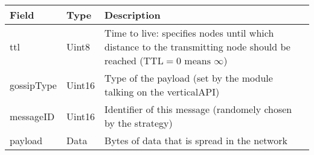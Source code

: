 \begin{tabularx}{.85\linewidth}{llX}
	\toprule
	Field & Type & Description
	\\
	\midrule
	ttl & Uint8 & Time to live: specifies nodes until which distance to the transmitting node should be reached ($\text{TTL} = 0 \text{ means } \infty$)
	\\
	gossipType & Uint16 & Type of the payload (set by the module talking on the verticalAPI)
	\\
	messageID & Uint16 & Identifier of this message (randomely chosen by the strategy)
	\\
	payload & Data & Bytes of data that is spread in the network
	\\
	\bottomrule
\end{tabularx}
